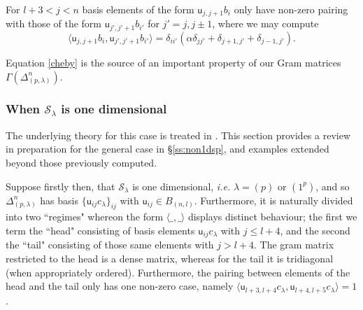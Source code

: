 \documentclass{article}
\newcommand{\ppm}[1]{\textcolor{red}{#1}}
\newcommand{\bajm}[1]{\textcolor{blue}{#1}}
\theoremstyle{definition}
\newcommand{\beq}{\begin{equation}}
\newcommand{\eq}{\end{equation}}
\newcommand{\Deltaa}{\Delta}   %
\def\uu{{\mathsf u}} %
\def\SS{\mathcal{S}} %
\def\a{\alpha}
\def\l{\lambda}
\numberwithin{equation}{subsection}
\begin{document}
For $l+3<j<n$ basis elements of the form $\uu_{j,j+1} b_i $ 
only have non-zero pairing with those of the form $\uu_{j',j'+1} b_{i'}$ for $j'=j,j\pm 1$, where we may compute
\beq \langle \uu_{j,j+1} b_i  , \uu_{j',j'+1}b_{i'} \rangle = \delta_{ii'}(\a \delta_{jj'}+\delta_{j+1,j'}+\delta_{j-1,j'}). \label{cheby} \eq

Equation \eqref{cheby} is the source of an important property of our Gram matrices $\Gamma(\Deltaa^{n}_{(p,\lambda)})$. 

\subsubsection{When $\SS_\l$ is one dimensional}\label{ss:1dspecht}

The underlying theory for this case is treated in \cite{KadarYu,ShBr}. 
This section provides a review in preparation for the general case in \S\ref{ss:non1dsp}, 
and examples extended beyond those previously computed. 

\medskip 

Suppose firstly 
then, 
that $\SS_\l$ is one dimensional, \textit{i.e.} $\l=(p)$ or $(1^p)$, and so $\Deltaa_{(p,\l)}^{n}$ has basis 
$\{ \uu_{ij} c_{\l} \}_{ij}$ with $\uu_{ij}\in B_{(n,l)}$. 
Furthermore, it is naturally divided into two ``regimes" whereon the form $\langle \_ , \_ \rangle$ displays distinct behaviour; the first we term the ``head" consisting of basis elements $ \uu_{ij} c_{\l}$ with $j\leq l+4$, and the second the ``tail" consisting of those same elements with $j>l+4$. The gram matrix restricted to the head is a dense matrix, whereas for the tail it is tridiagonal (when appropriately ordered). Furthermore, the pairing between elements of the head and the tail only has one non-zero case, namely $\langle \uu_{l+3,l+4} c_{\l}, \uu_{l+4,l+5} c_{\l} \rangle=1$.
\end{document}
